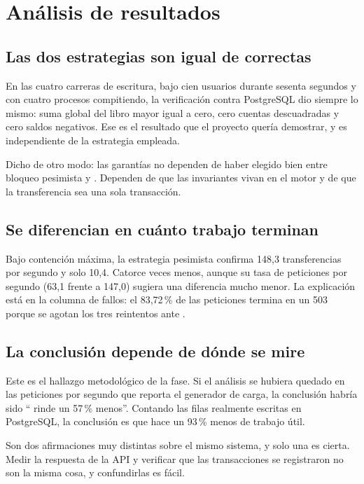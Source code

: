 \section{Análisis de resultados}
\label{sec:resultados}

\subsection{Las dos estrategias son igual de correctas}

En las cuatro carreras de escritura, bajo cien usuarios durante sesenta
segundos y con cuatro procesos compitiendo, la verificación contra PostgreSQL
dio siempre lo mismo: suma global del libro mayor igual a cero, cero cuentas
descuadradas y cero saldos negativos. Ese es el resultado que el proyecto
quería demostrar, y es independiente de la estrategia empleada.

Dicho de otro modo: las garantías no dependen de haber elegido bien entre
bloqueo pesimista y . Dependen de que las invariantes
vivan en el motor y de que la transferencia sea una sola transacción.

\subsection{Se diferencian en cuánto trabajo terminan}

Bajo contención máxima, la estrategia pesimista confirma 148,3 transferencias
por segundo y  solo 10,4. Catorce veces menos, aunque su
tasa de peticiones por segundo (63,1 frente a 147,0) sugiera una diferencia
mucho menor. La explicación está en la columna de fallos: el 83,72\,\% de las
peticiones termina en un 503 porque se agotan los tres reintentos ante
.

\subsection{La conclusión depende de dónde se mire}

Este es el hallazgo metodológico de la fase. Si el análisis se hubiera quedado
en las peticiones por segundo que reporta el generador de carga, la conclusión
habría sido \enquote{ rinde un 57\,\% menos}. Contando
las filas realmente escritas en PostgreSQL, la conclusión es que hace un
93\,\% menos de trabajo útil.

Son dos afirmaciones muy distintas sobre el mismo sistema, y solo una es
cierta. Medir la respuesta de la API y verificar que las transacciones se
registraron no son la misma cosa, y confundirlas es fácil.

